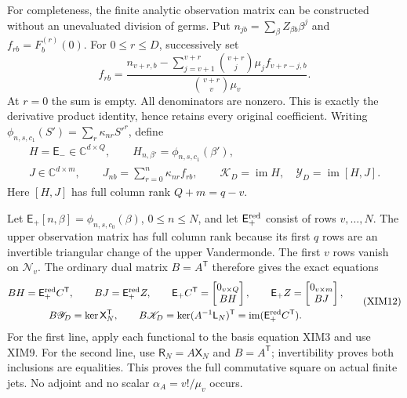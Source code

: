 For completeness, the finite analytic observation matrix can be
constructed without an unevaluated division of germs. Put
$n_{jb}=\sum_\beta Z_{\beta b}\beta^j$ and $f_{rb}=F_b^{(r)}(0)$.
For $0\le r\le D$, successively set
\[
 f_{rb}=
 \frac{n_{v+r,b}-\displaystyle\sum_{j=v+1}^{v+r}
          \binom{v+r}{j}\mu_j f_{v+r-j,b}}
      {\binom{v+r}{v}\mu_v}.
 \tag{XIM10}
\]
At $r=0$ the sum is empty. All denominators are nonzero. This is
exactly the derivative product identity, hence retains every original
coefficient. Writing $\phi_{n,s,c_1}(S')=\sum_r\kappa_{nr}S'^r$,
define
\[
\begin{gathered}
 H=\mathsf E_-\in\mathbb C^{d\times Q},\qquad
 H_{n,\beta'}=\phi_{n,s,c_1}(\beta'),\\
 J\in\mathbb C^{d\times m},\qquad
 J_{nb}=\sum_{r=0}^n\kappa_{nr}f_{rb},\qquad
 \mathscr K_D=\operatorname{im}H,\quad
 \mathscr Y_D=\operatorname{im}[H,J].
\end{gathered}\tag{XIM11}
\]
Here $[H,J]$ has full column rank $Q+m=q-v$.

Let $\mathsf E_+[n,\beta]=\phi_{n,s,c_0}(\beta)$, $0\le n\le N$,
and let $\mathsf E_+^{\rm red}$ consist of rows $v,\ldots,N$.
The upper observation matrix has full column rank because its first
$q$ rows are an invertible triangular change of the upper Vandermonde.
The first $v$ rows vanish on $\mathscr N_v$. The ordinary dual
matrix $B=A^{\mathsf T}$ therefore gives the exact equations
\[
\begin{gathered}
 BH=\mathsf E_+^{\rm red}C^{\mathsf T},\qquad
 BJ=\mathsf E_+^{\rm red}Z,\qquad
 \mathsf E_+C^{\mathsf T}=\begin{bmatrix}0_{v\times Q}\\BH\end{bmatrix},
 \qquad \mathsf E_+Z=\begin{bmatrix}0_{v\times m}\\BJ\end{bmatrix},\\
 B\mathscr Y_D=\ker\mathsf X_N^{\mathsf T},\qquad
 B\mathscr K_D=\ker(A^{-1}\mathsf L_N)^{\mathsf T}
                =\operatorname{im}(\mathsf E_+^{\rm red}C^{\mathsf T}).
\end{gathered}\tag{XIM12}
\]
For the first line, apply each functional to the basis equation XIM3
and use XIM9. For the second line, use $\mathsf R_N=A\mathsf X_N$
and $B=A^{\mathsf T}$; invertibility proves both inclusions are
equalities. This proves the full commutative square on actual finite
jets. No adjoint and no scalar $\alpha_A=v!/\mu_v$ occurs.

